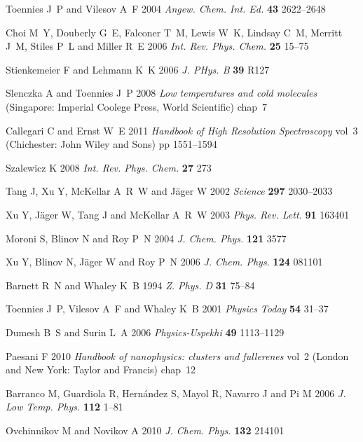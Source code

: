 \documentclass[12pt]{iopart}
\begin{document}
\begin{thebibliography}{100}
Toennies J~P and Vilesov A~F 2004 {\em Angew. Chem. Int. Ed.\/} {\bf 43}
  2622--2648

Choi M~Y, Douberly G~E, Falconer T~M, Lewis W~K, Lindsay C~M, Merritt J~M,
  Stiles P~L and Miller R~E 2006 {\em Int. Rev. Phys. Chem.\/} {\bf 25} 15--75

Stienkemeier F and Lehmann K~K 2006 {\em J. PHys. B\/} {\bf 39} R127

Slenczka A and Toennies J~P 2008 {\em Low temperatures and cold molecules\/}
  (Singapore: Imperial Coolege Press, World Scientific) chap~7

Callegari C and Ernst W~E 2011 {\em Handbook of High Resolution Spectroscopy\/}
  vol~3 (Chichester: John Wiley and Sons) pp 1551--1594

Szalewicz K 2008 {\em Int. Rev. Phys. Chem.\/} {\bf 27} 273

Tang J, Xu Y, McKellar A~R~W and J{\"a}ger W 2002 {\em Science\/} {\bf 297}
  2030--2033

Xu Y, J{\"a}ger W, Tang J and McKellar A~R~W 2003 {\em Phys. Rev. Lett.\/} {\bf
  91} 163401

Moroni S, Blinov N and Roy P~N 2004 {\em J. Chem. Phys.\/} {\bf 121} 3577

Xu Y, Blinov N, J{\"a}ger W and Roy P~N 2006 {\em J. Chem. Phys.\/} {\bf 124}
  081101

Barnett R~N and Whaley K~B 1994 {\em Z. Phys. D\/} {\bf 31} 75--84

Toennies J~P, Vilesov A~F and Whaley K~B 2001 {\em Physics Today\/} {\bf 54}
  31--37

Dumesh B~S and Surin L~A 2006 {\em Physics-Uspekhi\/} {\bf 49} 1113--1129

Paesani F 2010 {\em Handbook of nanophysics: clusters and fullerenes\/} vol~2
  (London and New York: Taylor and Francis) chap~12

Barranco M, Guardiola R, Hern{\'a}ndez S, Mayol R, Navarro J and Pi M 2006 {\em
  J. Low Temp. Phys.\/} {\bf 112} 1--81

Ovchinnikov M and Novikov A 2010 {\em J. Chem. Phys.\/} {\bf 132} 214101


\end{thebibliography}
\end{document}

